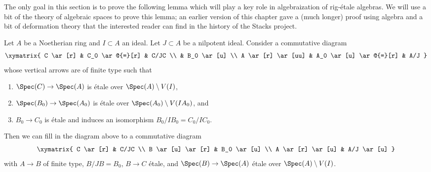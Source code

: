 \noindent
The only goal in this section is to prove the following lemma which
will play a key role in algebraization of rig-\'etale algebras.
We will use a bit of the theory of algebraic spaces to prove this lemma;
an earlier version of this chapter gave a (much longer) proof using algebra
and a bit of deformation theory that the interested reader can find in
the history of the Stacks project.

\begin{lemma}
\label{lemma-lift-approximation}
Let $A$ be a Noetherian ring and $I \subset A$ an ideal.
Let $J \subset A$ be a nilpotent ideal. Consider a commutative diagram
$$
\xymatrix{
C \ar[r] & C_0 \ar@{=}[r] & C/JC \\
& B_0 \ar[u] \\
A \ar[r] \ar[uu] & A_0 \ar[u] \ar@{=}[r] & A/J
}
$$
whose vertical arrows are of finite type such that
\begin{enumerate}
\item $\Spec(C) \to \Spec(A)$ is \'etale over $\Spec(A) \setminus V(I)$,
\item $\Spec(B_0) \to \Spec(A_0)$ is \'etale over
$\Spec(A_0) \setminus V(IA_0)$, and
\item $B_0 \to C_0$ is \'etale and induces an isomorphism
$B_0/IB_0 = C_0/IC_0$.
\end{enumerate}
Then we can fill in the diagram above to a commutative diagram
$$
\xymatrix{
C \ar[r] & C/JC \\
B \ar[u] \ar[r] & B_0 \ar[u] \\
A \ar[r] \ar[u] & A/J \ar[u]
}
$$
with $A \to B$ of finite type, $B/JB = B_0$, $B \to C$ \'etale, and
$\Spec(B) \to \Spec(A)$ \'etale over $\Spec(A) \setminus V(I)$.
\end{lemma}

